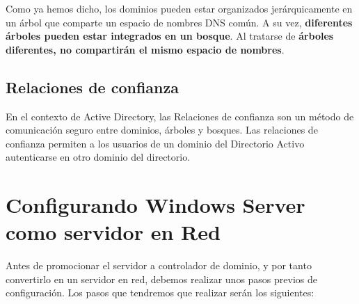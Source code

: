 Como ya hemos dicho, los dominios pueden estar organizados jerárquicamente en un árbol que comparte un espacio de nombres DNS común. A su vez, \textbf{diferentes árboles pueden estar integrados en un bosque}. Al tratarse de \textbf{árboles diferentes, no compartirán el mismo espacio de nombres}.

\subsection{Relaciones de confianza}
En el contexto de Active Directory, las Relaciones de confianza son un método de comunicación seguro entre dominios, árboles y bosques. Las relaciones de confianza permiten a los usuarios de un dominio del Directorio Activo autenticarse en otro dominio del directorio.


\section{Configurando Windows Server como servidor en Red}
Antes de promocionar el servidor a controlador de dominio, y por tanto convertirlo en un servidor en red, debemos realizar unos pasos previos de configuración. Los pasos que tendremos que realizar serán los siguientes:

